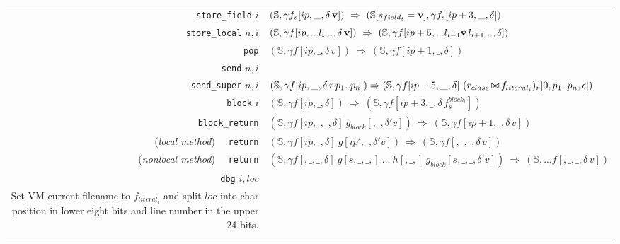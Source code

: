 \documentclass[11pt]{article}
\begin{document}
\begin{table}[tbp]
\begin{center}
\begin{tabular}{|r|l|}
{\tt store\_field} $i$ & $(\mathbb{S}, \gamma f_s[ip,\_,\delta \,{\bf v}]) ~\Rightarrow~ (\mathbb{S}[s_{field_i} = {\bf v}],\gamma f_s[ip+3,\_,\delta])$ \\

{\tt store\_local} $n,i$ & $(\mathbb{S},\gamma f[ip, ...l_i...,\delta \,{\bf v}]) ~\Rightarrow~ (\mathbb{S},\gamma f[ip+5,...l_{i-1} {\bf v} \,l_{i+1}...,\delta])$ \\

{\tt pop} & $(\mathbb{S},\gamma f[ip,\_,\delta \,v]) ~\Rightarrow~ (\mathbb{S},\gamma f[ip+1,\_,\delta])$\\
\hline

{\tt send} $n,i$\\
{\tt send\_super} $n,i$ & 
\begin{minipage}[c]{.78\linewidth}
$(\mathbb{S},\gamma f[ip,\_,\delta \,r\, p_1 .. p_{n}]) \Rightarrow 
(\mathbb{S},\gamma f[ip+5,\_,\delta] ~(r_{class}\,{\small \bowtie} \,f_{literal_i})_r[0,p_1 .. p_{n},\epsilon])$
\end{minipage}\\

{\tt block} $i$  & $(\mathbb{S},\gamma f[ip,\_,\delta]) ~\Rightarrow~ (\mathbb{S},\gamma f[ip+3,\_,\delta \,f^{block_i}_s])$\\

{\tt block\_return} &  $(\mathbb{S},\gamma f[ip,\_,\_,\delta]~g_{block}[,\_,\delta' v]) ~\Rightarrow~ (\mathbb{S},\gamma f[ip+1,\_,\delta \,v])$\\

({\em local method}) ~~{\tt return} & $(\mathbb{S},\gamma f[ip,\_,\delta] ~g[ip',\_,\delta' v]) ~\Rightarrow~ (\mathbb{S},\gamma f[,\_,\_,\delta \,v])$\\

({\em nonlocal method}) ~~{\tt return} & $(\mathbb{S},\gamma f[,\_,\_,\delta] ~g[s,\_,\_,]~ ... ~h[,\_,] ~ g_{block}[s,\_,\_,\delta' v]) ~\Rightarrow~ (\mathbb{S},...f[,\_,\_,\delta \,v])$\\

\hline

{\tt dbg} $i, loc$ &
\begin{minipage}[c]{.7\linewidth}
$(\mathbb{S},\gamma f[ip,\_,\_]) ~\Rightarrow~\\
 (\mathbb{S}[\text{\it file}=f_{literal_i}, \text{\it line}=loc\text{\tt>>}8, \text{\it column}=loc\text{\tt \&0xFF}],\gamma f[ip+7,\_,\_])$ \\
Set VM current filename to $f_{literal_i}$ and split $loc$ into char position in lower eight bits and line number in the upper 24 bits.\\
\end{minipage}\\
\hline
\end{tabular}
\end{center}
\label{default}
\end{table}%

\begin{minipage}[c]{0.25\linewidth}
\begin{alltt}
\end{alltt}
\end{minipage} 
\end{document}
